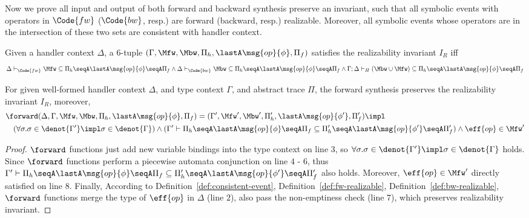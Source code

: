 Now we prove all input and output of both forward and backward
synthesis preserve an invariant, such that all symbolic events with
operators in $\Code{fw}$ ($\Code{bw}$, resp.) are forward (backward,
resp.) realizable. Moreover, all symbolic events whose operators are
in the intersection of these two sets are consistent with handler
context.

\begin{definition}
  \label{def:realizable-inv}
  Given a handler context $\Delta$, a 6-tuple
  $(\Gamma, \Mfw, \Mbw,\Pi_h, \lastA \msg{op}{\phi}, \Pi_f)$ satisfies
  the realizability invariant $I_R$ iff
  {\small
    \begin{align*} \Delta
      \vdash_\Code{fw} \Mfw \subseteq \Pi_h \seqA \lastA
      \msg{op}{\phi} \seqA \Pi_f \land \Delta \vdash_\Code{bw} \Mbw
      \subseteq \Pi_h \seqA \lastA \msg{op}{\phi} \seqA \Pi_f \land
      \Gamma;\Delta \vdash_H (\Mbw \cup \Mfw) \subseteq \Pi_h \seqA
      \lastA \msg{op}{\phi} \seqA \Pi_f \end{align*}}\noindent
\end{definition}




\begin{lemma}
  \label{lemma:fw-sound}
  For given well-formed handler context $\Delta$, and type context
  $\Gamma$, and abstract trace $\Pi$, the forward synthesis preserves
  the realizability invariant $I_R$, moreover,
 {\small\begin{align*}
&\forward(\Delta, \Gamma, \Mfw, \Mbw,\Pi_h, \lastA \msg{op}{\phi}, \Pi_f) = (\Gamma', \Mfw', \Mbw',\Pi_h', \lastA \msg{op}{\phi'}, \Pi_f') \impl
\\&\quad (\forall \sigma. \sigma \in\denot{\Gamma'} \impl \sigma \in\denot{\Gamma}) \land (\Gamma' \vdash \Pi_h \seqA \lastA \msg{op}{\phi} \seqA \Pi_f \subseteq \Pi_h' \seqA \lastA \msg{op}{\phi'} \seqA \Pi_f' ) \land \eff{op}\in \Mfw'
\end{align*}}
\end{lemma}
\begin{proof} $\forward$ functions just add new variable bindings into
  the type context on line $3$, so
  $\forall \sigma. \sigma \in\denot{\Gamma'} \impl \sigma
  \in\denot{\Gamma}$ holds. Since $\forward$ functions perform a
  piecewise automata conjunction on line $4$ - $6$, thus
  $\Gamma' \vdash \Pi_h \seqA \lastA \msg{op}{\phi} \seqA \Pi_f
  \subseteq \Pi_h' \seqA \lastA \msg{op}{\phi'} \seqA \Pi_f' $ also
  holds. Moreover, $\eff{op}\in \Mfw'$ directly satisfied on line $8$.
  Finally, According to Definition~\ref{def:consistent-event},
  Definition~\ref{def:fw-realizable},
  Definition~\ref{def:bw-realizable}, $\forward$ functions merge the
  type of $\eff{op}$ in $\Delta$ (line $2$), also pass the
  non-emptiness check (line $7$), which preserves realizability
  invariant. \end{proof}

